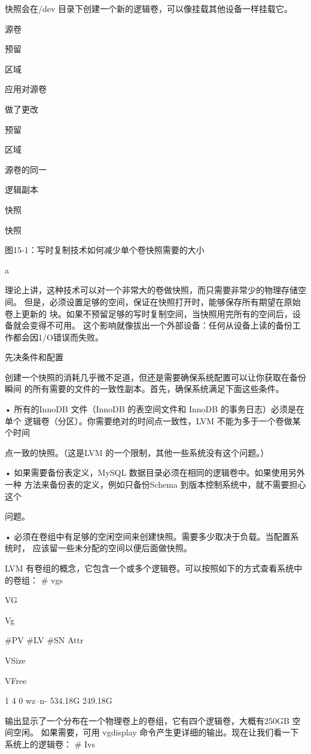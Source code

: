 快照会在/dev 目录下创建一个新的逻辑卷，可以像挂载其他设备一样挂载它。

源卷

预留

区域

应用对源卷

做了更改

预留

区域

源卷的同一

逻辑副本

快照

快照

图15-1：写时复制技术如何减少单个卷快照需要的大小

a

理论上讲，这种技术可以对一个非常大的卷做快照，而只需要非常少的物理存储空间。
但是，必须设置足够的空间，保证在快照打开时，能够保存所有期望在原始卷上更新的
块。如果不预留足够的写时复制空间，当快照用完所有的空间后，设备就会变得不可用。
这个影响就像拔出一个外部设备：任何从设备上读的备份工作都会因1/O错误而失败。

先决条件和配置

创建一个快照的消耗几乎微不足道，但还是需要确保系统配置可以让你获取在备份瞬间
的所有需要的文件的一致性副本。首先，确保系统满足下面这些条件。

• 所有的InnoDB 文件（InnoDB 的表空间文件和 InnoDB 的事务日志）必须是在单个
逻辑卷（分区）。你需要绝对的时间点一致性，LVM 不能为多于一个卷做某个时间

点一致的快照。（这是LVM 的一个限制，其他一些系统没有这个问题。）

• 如果需要备份表定义，MySQL 数据目录必须在相同的逻辑卷中。如果使用另外一种
方法来备份表的定义，例如只备份Schema 到版本控制系统中，就不需要担心这个

问题。

• 必须在卷组中有足够的空闲空间来创建快照。需要多少取决于负载。当配置系统时，
应该留一些未分配的空间以便后面做快照。

LVM 有卷组的概念，它包含一个或多个逻辑卷。可以按照如下的方式查看系统中的卷组：
# vgs

VG

Vg

#PV #LV #SN Attr

VSize

VFree

1 4 0 wz--n- 534.18G 249.18G

输出显示了一个分布在一个物理卷上的卷组，它有四个逻辑卷，大概有250GB 空间空闲。
如果需要，可用 vgdisplay 命令产生更详细的输出。现在让我们看一下系统上的逻辑卷：
# Ivs

